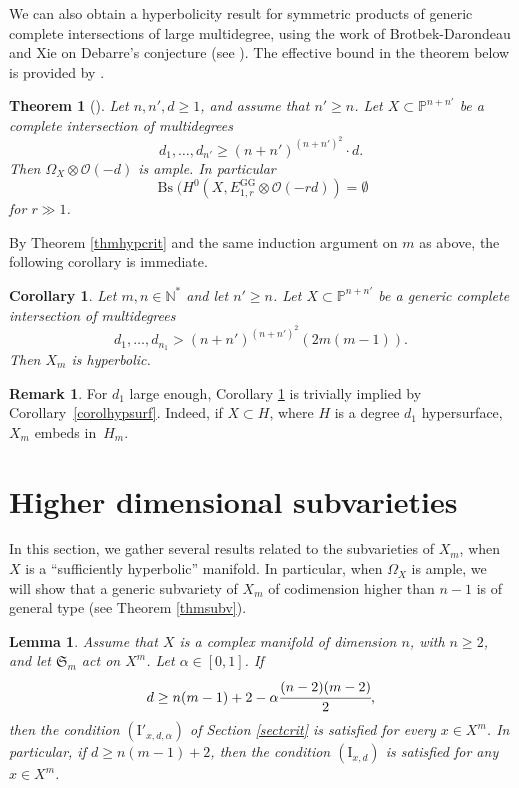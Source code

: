 \documentclass[JEP,XML,SOM,Unicode, NoEqCountersInSection,NoFloatCountersInSection,published]{cedram}
\let\mathcal\mathscr
\newcommand{\rGG}{\mathrm{GG}}
\newcommand{\rI}{\mathrm{I}}
\DeclareMathOperator{\Bs}{Bs}
\theoremstyle{theorem}
\newtheorem{theorem}{Theorem}
\newtheorem{lemma}[proposition]{Lemma}
\newtheorem{corollary}[proposition]{Corollary}
\theoremstyle{definition}
\newtheorem{remark}[proposition]{Remark}
\begin{document}
We can also obtain a hyperbolicity result for symmetric products of generic complete intersections of large multidegree, using the work of Brotbek-Darondeau and Xie on Debarre's conjecture (see \cite{BD18, xie18}). The effective bound in the theorem below is provided by \cite{xie18}.

\begin{theorem}[\cite{BD18, xie18}]
Let $n, n', d \geq 1$, and assume that $n' \geq n$. Let $X \subset \mathbb P^{n+n'}$ be a complete intersection of multidegrees
\[
d_1,\dots, d_{n'} \geq (n+n')^{(n+n')^{2}} \cdot d.
\]
Then $\Omega_X \otimes \mathcal O(-d)$ is ample. In particular
\[
\Bs( H^0(X, E_{1, r}^{\rGG} \otimes \mathcal O(-rd)) = \emptyset
\]
for $r \gg 1$.
\end{theorem}

By Theorem \ref{thmhypcrit} and the same induction argument on $m$ as above, the following corollary is immediate.

\begin{corollary} \label{corolintcomp}
Let $m, n \in \mathbb N^\ast$ and let $n' \geq n$. Let $X \subset \mathbb P^{n + n'}$ be a generic complete intersection of multidegrees
\[
d_1,\dots, d_{n_1} > (n+n')^{(n+n')^2} (2m(m-1)).
\]
Then $X_m$ is hyperbolic.
\end{corollary}

\begin{remark} For $d_1$ large enough, Corollary \ref{corolintcomp} is trivially implied by Corollary~\ref{corolhypsurf}. Indeed, if $X \subset H$, where $H$ is a degree $d_1$ hypersurface, $X_m$ embeds in~$H_m$.
\end{remark}

\section{Higher dimensional subvarieties} \label{sec:higherdim}
In this section, we gather several results related to the subvarieties of $X_m$, when~$X$ is a ``sufficiently hyperbolic'' manifold. In particular, when $\Omega_X$ is ample, we will show that a generic subvariety of $X_m$ of codimension higher than $n-1$ is of general type (see Theorem \ref{thmsubv}).

\begin{lemma} \label{lemcrit}
Assume that $X$ is a complex manifold of dimension $n$, with $n \geq 2$, and let $\mathfrak{S}_m$ act on $X^m$. Let $\alpha \in [0, 1]$. If
\[
d \geq n(m-1) + 2 - \alpha \cfrac{(n-2)(m-2)}{2},
\]
then the condition $(\rI'_{x, d, \alpha})$ of Section \ref{sectcrit} is satisfied for every $x \in X^m$. In particular, if $d \geq n(m-1) + 2$, then the condition $(\rI_{x, d})$ is satisfied for any $x \in X^m$.
\end{lemma}
\end{document}
